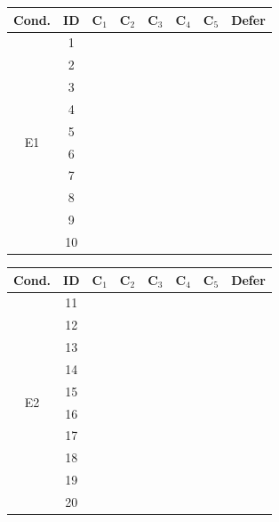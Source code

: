 \documentclass[11pt, letterpaper, shortlabels]{berkeley}
\newcommand{\cmark}{\textcolor{green!60!black}{\ding{51}}} %
\newcommand{\xmark}{\textcolor{red!70!black}{\ding{55}}}   %
\begin{document}
{\begin{table}[!htbp]
\begin{minipage}[t]{0.48\linewidth}
\centering
\begin{tabular}{cccccccc}
\toprule
Cond. & ID & C$_1$ & C$_2$ & C$_3$ & C$_4$ & C$_5$ & Defer \\
\midrule
\multirow{10}{*}{E1}
 & 1  & \cmark & \cmark & \xmark & \cmark & \cmark & \xmark \\
 & 2  & \cmark & \cmark & \xmark & \cmark & \cmark & \xmark \\
 & 3  & \cmark & \cmark & \xmark & \cmark & \cmark & \xmark \\
 & 4  & \cmark & \cmark & \xmark & \cmark & \cmark & \xmark \\
 & 5  & \cmark & \cmark & \xmark & \cmark & \cmark & \xmark \\
 & 6  & \cmark & \cmark & \xmark & \cmark & \cmark & \xmark \\
 & 7  & \cmark & \cmark & \xmark & \cmark & \cmark & \xmark \\
 & 8  & \cmark & \cmark & \xmark & \cmark & \cmark & \xmark \\
 & 9  & \cmark & \cmark & \xmark & \cmark & \cmark & \xmark \\
 & 10 & \cmark & \cmark & \xmark & \cmark & \cmark & \xmark \\
\bottomrule
\end{tabular}
\end{minipage}
\hfill
\begin{minipage}[t]{0.48\linewidth}
\centering
\begin{tabular}{cccccccc}
\toprule
Cond. & ID & C$_1$ & C$_2$ & C$_3$ & C$_4$ & C$_5$ & Defer \\
\midrule
\multirow{10}{*}{E2}
 & 11 & \cmark & \cmark & \xmark & \xmark & \xmark & \cmark \\
 & 12 & \cmark & \cmark & \xmark & \xmark & \xmark & \cmark \\
 & 13 & \cmark & \cmark & \xmark & \xmark & \xmark & \cmark \\
 & 14 & \cmark & \cmark & \xmark & \xmark & \xmark & \cmark \\
 & 15 & \cmark & \cmark & \xmark & \xmark & \xmark & \cmark \\
 & 16 & \cmark & \cmark & \xmark & \xmark & \xmark & \cmark \\
 & 17 & \cmark & \cmark & \xmark & \xmark & \xmark & \cmark \\
 & 18 & \cmark & \cmark & \xmark & \xmark & \xmark & \cmark \\
 & 19 & \cmark & \cmark & \xmark & \xmark & \xmark & \cmark \\
 & 20 & \cmark & \cmark & \xmark & \xmark & \xmark & \cmark \\
\bottomrule
\end{tabular}
\end{minipage}


\end{table}}
\end{document}
